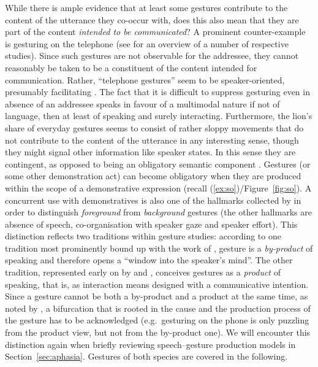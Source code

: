 \documentclass[output=paper,biblatex,babelshorthands,newtxmath,draftmode,colorlinks,citecolor=brown]{langscibook}
\begin{document}
\largerpage[1]
While there is ample evidence that at least some gestures contribute to the content of the utterance they co-occur with, does this also mean that they are part of the content \emph{intended to be communicated}?
%
A prominent counter-example is gesturing on the telephone (see \citealt{Bavelas:Gerwing:Sutton:Prevost:2008} for an overview of a number of respective studies).
%
Since such gestures are not observable for the addressee, they cannot reasonably be taken to be a constituent of the content intended for communication.
%
Rather, \enquote{telephone gestures} seem to be speaker-oriented, presumably facilitating .
%
The fact that it is difficult to suppress gesturing even in absence of an addressee speaks in favour of a multimodal nature if not of language, then at least of speaking and surely interacting.
%
Furthermore, the lion's share of everyday gestures seems to consist of rather sloppy movements that do not contribute to the content of the utterance in any interesting sense, though they might signal other information like speaker states.
%
In this sense they are contingent, as opposed to being an obligatory semantic component \citep{Luecking:2013:a}.
%
Gestures (or some other demonstration act) can become obligatory when they are produced within the scope of a demonstrative expression (recall (\ref{ex:so})/Figure~\ref{fig:so}).
%
A concurrent use with demonstratives is also one of the hallmarks collected by \citet{Cooperrider:2017} in order to distinguish \emph{foreground} from \emph{background} gestures (the other hallmarks are absence of speech, co-organisation with speaker gaze and speaker effort).
%
This distinction reflects two traditions within gesture studies: according to one tradition most prominently bound up with the work of \citet{McNeill:1992}, gesture is a \emph{by-product} of speaking and therefore opens a \enquote{window into the speaker's mind}.
%
The other tradition, represented early on by \citet{Goodwin:2003} and \citet{Clark:1996}, conceives gestures as a \emph{product} of speaking, that is, as interaction means designed with a communicative intention.
%
Since a gesture cannot be both a by-product and a product at the same time, as noted by \citet{Cooperrider:2017}, a bifurcation that is rooted in the cause and the production process of the gesture has to be acknowledged (e.g.\ gesturing on the phone is only puzzling from the product view, but not from the by-product one). 
%
We will encounter this distinction again when briefly reviewing speech--gesture production models in Section~\ref{sec:aphasia}.
%
Gestures of both species are covered in the following.
\end{document}

